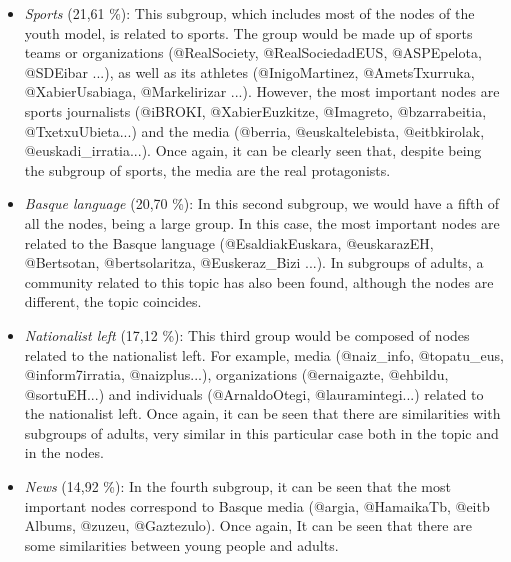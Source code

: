 \documentclass[information,article,submit,moreauthors,pdftex,10pt,a4paper]{Definitions/mdpi}
\begin{document}
\begin{itemize}
\item \textit{Sports} (21,61 \%): This subgroup, which includes most of the nodes of the youth model, is related to sports. The group would be made up of sports teams or organizations (@RealSociety, @RealSociedadEUS, @ASPEpelota, @SDEibar ...), as well as its athletes (@InigoMartinez, @AmetsTxurruka, @XabierUsabiaga, @Markelirizar ...). However, the most important nodes are sports journalists (@iBROKI, @XabierEuzkitze, @Imagreto, @bzarrabeitia, @TxetxuUbieta...) and the media (@berria, @euskaltelebista, @eitbkirolak, @euskadi\_irratia...). Once again, it can be clearly seen that, despite being the subgroup of sports, the media are the real protagonists.
\end{itemize}

\begin{itemize}
\item \textit{Basque language} (20,70 \%): In this second subgroup, we would have a fifth of all the nodes, being a large group. In this case, the most important nodes are related to the Basque language (@EsaldiakEuskara, @euskarazEH, @Bertsotan, @bertsolaritza, @Euskeraz\_Bizi ...). In subgroups of adults, a community related to this topic has also been found, although the nodes are different, the topic coincides.
\end{itemize}

\begin{itemize}
\item \textit{Nationalist left} (17,12 \%): This third group would be composed of nodes related to the nationalist left. For example, media (@naiz\_info, @topatu\_eus, @inform7irratia, @naizplus...), organizations (@ernaigazte, @ehbildu, @sortuEH...) and individuals (@ArnaldoOtegi, @lauramintegi...) related to the nationalist left. Once again, it can be seen that there are similarities with subgroups of adults, very similar in this particular case both in the topic and in the nodes.
\end{itemize}

\begin{itemize}
\item \textit{News} (14,92 \%): In the fourth subgroup, it can be seen that the most important nodes correspond to Basque media (@argia, @HamaikaTb, @eitb Albums, @zuzeu, @Gaztezulo). Once again, It can be seen that there are some similarities between young people and adults.
\end{itemize}
\end{document}
